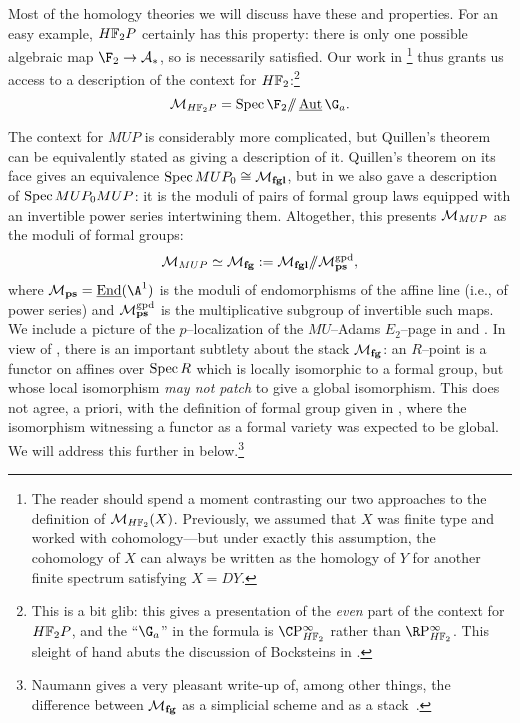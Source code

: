 \begin{example}
Most of the homology theories we will discuss have these {\CH} and {\FH} properties.  For an easy example, \(\HFtwo P\) certainly has this property: there is only one possible algebraic map \(\F_2 \to \mathcal A_*\), so {\FH} is necessarily satisfied.  Our work in \footnote{The reader should spend a moment contrasting our two approaches to the definition of \(\context{\HFtwo}(X)\).  Previously, we assumed that \(X\) was finite type and worked with cohomology---but under exactly this assumption, the cohomology of \(X\) can always be written as the homology of \(Y\) for another finite spectrum satisfying \(X = DY\).} thus grants us access to a description of the context for \(\HFtwo\):\footnote{This is a bit glib: this gives a presentation of the \emph{even} part of the context for \(\HFtwo P\), and the ``\(\G_a\)'' in the formula is \(\CP^\infty_{\HFtwo}\) rather than \(\RP^\infty_{\HFtwo}\).  This sleight of hand abuts the discussion of Bocksteins in .} \[\context{\HFtwo P} = \Spec \F_2 \mmod \InternalAut{\G_a}.\]
\end{example}

\begin{example}\label{ContextOfMUPExample}
The context for \(MUP\) is considerably more complicated, but Quillen's theorem can be equivalently stated as giving a description of it.  Quillen's theorem on its face gives an equivalence \(\operatorname{Spec} MUP_0 \cong \mathcal{M}_{\mathbf{fgl}}\), but in  we also gave a description of \(\operatorname{Spec} MUP_0 MUP\): it is the moduli of pairs of formal group laws equipped with an invertible power series intertwining them.  Altogether, this presents \(\mathcal{M}_{MUP}\) as the moduli of formal groups: \[\mathcal{M}_{MUP} \simeq \mathcal{M}_{\mathbf{fg}} := \mathcal{M}_{\mathbf{fgl}} /\!\!/ \mathcal{M}_{\mathbf{ps}}^{\mathrm{gpd}},\] where \(\moduli{ps} = \InternalEnd(\A^1)\) is the moduli of endomorphisms of the affine line (i.e., of power series) and \(\mathcal{M}_{\mathbf{ps}}^{\mathrm{gpd}}\) is the multiplicative subgroup of invertible such maps.  We include a picture of the \(p\)--localization of the \(MU\)--Adams \(E_2\)--page in  and .  In view of , there is an important subtlety about the stack \(\mathcal{M}_{\mathbf{fg}}\): an \(R\)--point is a functor on affines over \(\operatorname{Spec} R\) which is locally isomorphic to a formal group, but whose local isomorphism \emph{may not patch} to give a global isomorphism.  This does not agree, a priori, with the definition of formal group given in , where the isomorphism witnessing a functor as a formal variety was expected to be global.  We will address this further in  below.\footnote{Naumann gives a very pleasant write-up of, among other things, the difference between $\mathcal{M}_{\mathbf{fg}}$ as a simplicial scheme and as a stack~\cite{Naumann}.}
\end{example}

